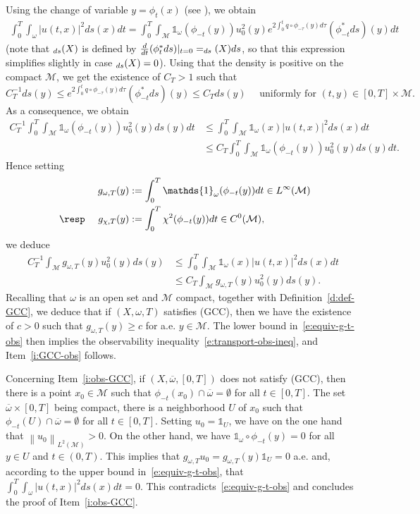 \documentclass[JEP,XML,SOM,Unicode]{cedram}
\newcommand{\pGCC}{\textup{(GCC)}\xspace}
\theoremstyle{definition}
\newcommand{\M}{\ensuremath{\mathcal M}}
\let \div \relax
\DeclareMathOperator{\div}{div}
\newcommand\nor[2]{\left\|#1\right\|_{#2}}
\let\ovl\overline
\begin{document}
Using the change of variable $y=\phi_t(x)$ (see \eg \cite[Prop.\,16.42 p432]{Lee:book}), we obtain
\begin{align*}
\int_0^T\int_\omega |u(t,x)|^2 ds(x)dt
= \int_0^T\int_\M \mathds{1}_\omega(\phi_{-t}(y)) u_0^2(y)e^{2\int_0^tq \circ\phi_{-\tau}(y)d\tau} (\phi_{-t}^*ds)(y)dt
\end{align*}
(note that $\div_{ds}(X)$ is defined by $\frac{d}{dt} (\phi_{t}^*ds)|_{t=0} = \div_{ds}(X) ds$, so that this expression simplifies slightly in case $\div_{ds}(X)=0$).
Using that the density is positive on the compact $\M$, we get the existence of $C_T>1$ such that
\[
C_T^{-1} ds(y) \leq e^{2\int_0^tq \circ\phi_{-\tau}(y)d\tau} (\phi_{-t}^*ds)(y) \leq C_T ds(y) \quad \text{ uniformly for } (t,y) \in [0,T]\times \M.
\]
As a consequence, we obtain
\begin{align*}
C_T^{-1} \int_0^T\int_\M \mathds{1}_\omega(\phi_{-t}(y)) u_0^2(y) ds(y)dt
& \leq \int_0^T\int_\M \mathds{1}_\omega(x) |u(t,x)|^2 ds(x)dt \\
& \leq C_T \int_0^T\int_\M \mathds{1}_\omega(\phi_{-t}(y)) u_0^2(y) ds(y)dt.
\end{align*}
Hence setting
\begin{align*}
g_{\omega,T}(y) &:= \int_0^T \mathds{1}_\omega(\phi_{-t}(y)) dt \in L^\infty(\M) \\
\text{ \resp } \quad g_{\chi,T}(y) &:= \int_0^T \chi^2 (\phi_{-t}(y)) dt \in C^0(\M),
\end{align*}
we deduce
\begin{align}
\label{e:equiv-g-t-obs}
C_T^{-1} \int_\M g_{\omega,T}(y) u_0^2(y) ds(y)
& \leq \int_0^T\int_{\M} \mathds{1}_\omega(x) |u(t,x)|^2 ds(x)dt \nonumber \\
& \leq C_T \int_\M g_{\omega,T}(y) u_0^2(y) ds(y).
\end{align}
Recalling that $\omega$ is an open set and $\M$ compact, together with Definition~\ref{d:def-GCC}, we deduce that if $(X,\omega,T)$ satisfies \pGCC, then we have the existence of $c>0$ such that $g_{\omega,T}(y)\geq c$ for a.e. $y\in\M$. The lower bound in~\eqref{e:equiv-g-t-obs} then implies the observability inequality~\eqref{e:transport-obs-ineq}, and Item~\eqref{i:GCC-obs} follows.

Concerning Item~\eqref{i:obs-GCC}, if $(X,\ovl{\omega},[0,T])$ does not satisfy \pGCC, then there is a point $x_0\in \M$ such that $\phi_{-t}(x_0) \cap \ovl{\omega} = \emptyset$ for all $t\in [0,T]$. The set $\ovl{\omega}\times [0,T]$ being compact, there is a neighborhood $U$ of $x_0$ such that $\phi_{-t}(U) \cap \ovl{\omega} = \emptyset$ for all $t\in [0,T]$. Setting $u_0 = \mathds{1}_U$, we have on the one hand that $\nor{u_0}{L^2(\M)} >0$. On the other hand, we have $\mathds{1}_{\omega}\circ \phi_{-t}(y)= 0$ for all $y\in U$ and $t\in (0,T)$. This implies that $g_{\omega,T} u_0 = g_{\omega,T}(y) \mathds{1}_U = 0$ a.e. and, according to the upper bound in~\eqref{e:equiv-g-t-obs}, that $\int_0^T\int_\omega |u(t,x)|^2 ds(x)dt =0$. This contradicts~\eqref{e:equiv-g-t-obs} and concludes the proof of Item~\eqref{i:obs-GCC}.
\end{document}
